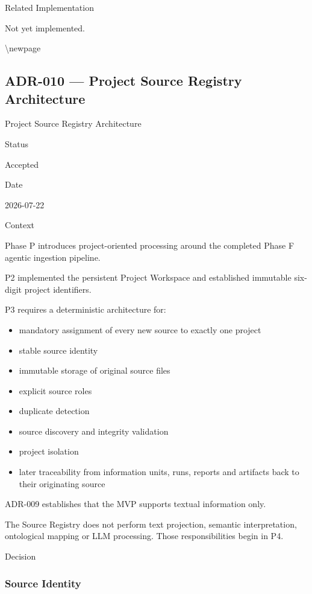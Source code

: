 Related Implementation

Not yet implemented.

\textbackslash newpage

\hypertarget{adr-010--project-source-registry-architecture}{%
\subsection{ADR-010 --- Project Source Registry Architecture}\label{adr-010--project-source-registry-architecture}}

Project Source Registry Architecture

Status

Accepted

Date

2026-07-22

Context

Phase P introduces project-oriented processing around the completed Phase F agentic ingestion pipeline.

P2 implemented the persistent Project Workspace and established immutable six-digit project identifiers.

P3 requires a deterministic architecture for:

\begin{itemize}
\tightlist
\item
  mandatory assignment of every new source to exactly one project
\item
  stable source identity
\item
  immutable storage of original source files
\item
  explicit source roles
\item
  duplicate detection
\item
  source discovery and integrity validation
\item
  project isolation
\item
  later traceability from information units, runs, reports and artifacts back to their originating source
\end{itemize}

ADR-009 establishes that the MVP supports textual information only.

The Source Registry does not perform text projection, semantic interpretation, ontological mapping or LLM processing. Those responsibilities begin in P4.

Decision

\hypertarget{source-identity}{%
\subsubsection{Source Identity}\label{source-identity}}

